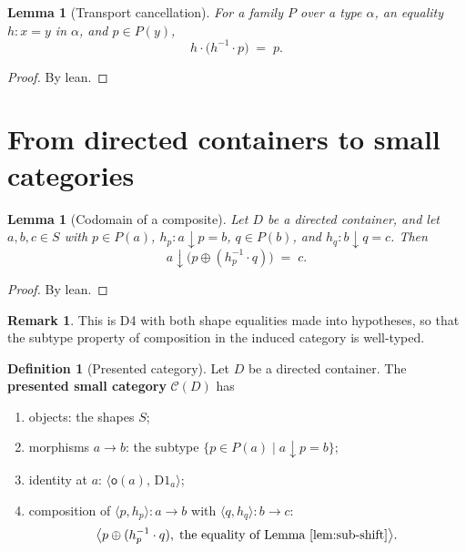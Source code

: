 \documentclass[11pt,a4paper]{article}
\theoremstyle{plain}
\newtheorem{lemma}[theorem]{Lemma}
\theoremstyle{definition}
\newtheorem{definition}[theorem]{Definition}
\newtheorem{remark}[theorem]{Remark}
\newcommand{\rootpos}{\mathsf{o}}
\newcommand{\sub}{\mathbin{\downarrow}}
\newcommand{\shift}{\oplus}
\newcommand{\cat}{\mathcal{C}}
\begin{document}
\begin{lemma}[Transport cancellation]\label{lem:transport-cancel}
For a family $P$ over a type $\alpha$, an equality $h:x=y$ in $\alpha$, and
$p\in P(y)$,
\begin{equation}
  h\cdot\bigl(h^{-1}\cdot p\bigr) \;=\; p.
\end{equation}
\end{lemma}

\begin{proof}
By lean.
\end{proof}

\section{From directed containers to small categories}

\begin{lemma}[Codomain of a composite]\label{lem:sub-shift}
Let $D$ be a directed container, and let $a,b,c\in S$ with $p\in P(a)$,
$h_p:a\sub p=b$, $q\in P(b)$, and $h_q:b\sub q=c$. Then
\begin{equation}
  a\sub\bigl(p\shift(h_p^{-1}\cdot q)\bigr) \;=\; c.
\end{equation}
\end{lemma}

\begin{proof}
By lean.
\end{proof}

\begin{remark}
This is D4 with both shape equalities made into hypotheses, so that the
subtype property of composition in the induced category is well-typed.
\end{remark}

\begin{definition}[Presented category]\label{def:to-smallcat}
Let $D$ be a directed container. The \textbf{presented small category}
$\cat(D)$ has
\begin{enumerate}
  \item objects: the shapes $S$;
  \item morphisms $a\to b$: the subtype
        $\bigl\{p\in P(a) \mid a\sub p = b\bigr\}$;
  \item identity at $a$: $\langle\rootpos(a),\,\mathrm{D1}_a\rangle$;
  \item composition of $\langle p,h_p\rangle:a\to b$ with
        $\langle q,h_q\rangle:b\to c$:
        \[
          \bigl\langle
            p\shift(h_p^{-1}\cdot q),\;
            \text{the equality of Lemma~\ref{lem:sub-shift}}
          \bigr\rangle.
        \]
\end{enumerate}
\end{definition}
\end{document}
